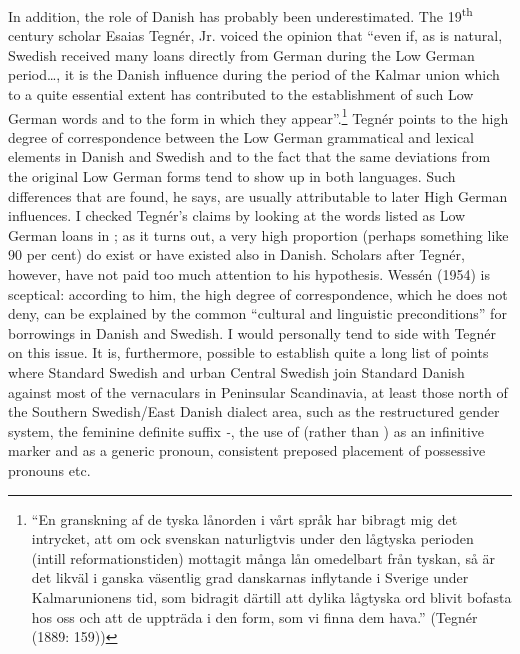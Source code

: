 In addition, the role of Danish has probably been underestimated. The 19\textsuperscript{th} century scholar Esaias Tegnér, Jr. voiced the opinion that “even if, as is natural, Swedish received many loans directly from German during the Low German period…, it is the Danish influence during the period of the Kalmar union which to a quite essential extent has contributed to the establishment of such Low German words and to the form in which they appear”.\footnote{ “En granskning af de tyska lånorden i vårt språk har bibragt mig det intrycket, att om ock svenskan naturligtvis under den lågtyska perioden (intill reformationstiden) mottagit många lån omedelbart från tyskan, så är det likväl i ganska väsentlig grad danskarnas inflytande i Sverige under Kalmarunionens tid, som bidragit därtill att dylika lågtyska ord blivit bofasta hos oss och att de uppträda i den form, som vi finna dem hava.” (Tegnér (1889: 159))} Tegnér points to the high degree of correspondence between the Low German grammatical and lexical elements in Danish and Swedish and to the fact that the same deviations from the original Low German forms tend to show up in both languages. Such differences that are found, he says, are usually attributable to later High German influences. I checked Tegnér’s claims by looking at the words listed as Low German loans in \citet{Hellquist1922}; as it turns out, a very high proportion (perhaps something like 90 per cent) do exist or have existed also in Danish. Scholars after Tegnér, however, have not paid too much attention to his hypothesis. Wessén (1954) is sceptical: according to him, the high degree of correspondence, which he does not deny, can be explained by the common “cultural and linguistic preconditions” for borrowings in Danish and Swedish. I would personally tend to side with Tegnér on this issue. It is, furthermore, possible to establish quite a long list of points where Standard Swedish and urban Central Swedish join Standard Danish against most of the vernaculars in Peninsular Scandinavia, at least those north of the Southern Swedish/East Danish dialect area, such as the restructured gender system, the feminine definite suffix\textit{ {}-}, the use of  (rather than ) as an infinitive marker and  as a generic pronoun, consistent preposed placement of possessive pronouns etc. 


